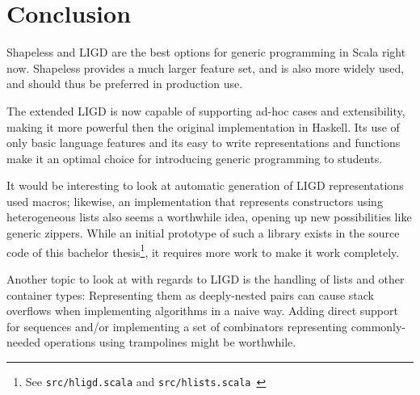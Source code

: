 \chapter{Conclusion}
Shapeless and LIGD are the best options for generic programming in Scala
right now. Shapeless provides a much larger feature set, and is also more
widely used, and should thus be preferred in production use.

The extended LIGD is now capable of supporting ad-hoc cases and extensibility,
making it more powerful then the original implementation in Haskell. Its use
of only basic language features and its easy to write representations and
functions make it an optimal choice for introducing generic programming to
students.

It would be interesting to look at automatic generation of LIGD representations
used macros; likewise, an implementation that represents constructors using
heterogeneous lists also seems a worthwhile idea, opening up new possibilities
like generic zippers. While an initial prototype of such a library exists in
the source code of this bachelor thesis\footnote{See \texttt{src/hligd.scala} and
\texttt{src/hlists.scala}~\cite{src}}, it requires more work to make it work completely.

Another topic to look at with regards to LIGD is the handling of lists and
other container types: Representing them as deeply-nested pairs can cause
stack overflows when implementing algorithms in a naive way. Adding direct
support for sequences and/or implementing a set of combinators representing
commonly-needed operations using trampolines might be worthwhile.
